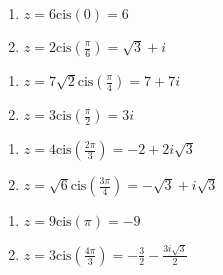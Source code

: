 \documentclass{ximera}
\begin{document}
\begin{multicols}{2}

\begin{enumerate}

\setcounter{enumi}{\value{HW}}

\item $z = 6\text{cis}(0) = 6$
\item $z = 2\text{cis}\left(\frac{\pi}{6}\right) = \sqrt{3} + i$

\setcounter{HW}{\value{enumi}}

\end{enumerate}

\end{multicols}

\begin{multicols}{2} 

\begin{enumerate}

\setcounter{enumi}{\value{HW}}

\item $z = 7\sqrt{2}\text{cis}\left(\frac{\pi}{4}\right) = 7+7i$
\item $z = 3\text{cis}\left(\frac{\pi}{2}\right) = 3i$ 

\setcounter{HW}{\value{enumi}}

\end{enumerate}

\end{multicols}

\begin{multicols}{2} 

\begin{enumerate}

\setcounter{enumi}{\value{HW}}

\item $z = 4\text{cis}\left(\frac{2\pi}{3}\right) = -2+2i\sqrt{3}$
\item $z = \sqrt{6}\text{cis}\left(\frac{3\pi}{4}\right) = -\sqrt{3}+i\sqrt{3}$ 

\setcounter{HW}{\value{enumi}}

\end{enumerate}

\end{multicols}

\begin{multicols}{2} 

\begin{enumerate}

\setcounter{enumi}{\value{HW}}

\item $z = 9\text{cis}\left(\pi\right) = -9$
\item $z = 3\text{cis}\left(\frac{4\pi}{3}\right) = -\frac{3}{2} - \frac{3i\sqrt{3}}{2}$

\setcounter{HW}{\value{enumi}}

\end{enumerate}

\end{multicols}
\end{document}
